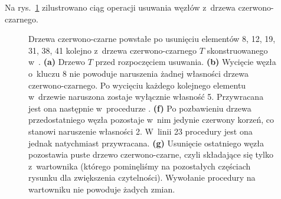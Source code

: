 
\exercise %
\exercise %
\exercise %
Na rys.\ \ref{fig:13.4-3} zilustrowano ciąg operacji usuwania węzłów z~drzewa czerwono-czarnego.
\begin{figure}[!ht]
	\centering 
	\caption{Drzewa czerwono-czarne powstałe po usunięciu elementów 8, 12, 19, 31, 38, 41 kolejno z~drzewa czerwono-czarnego $T$ skonstruowanego w~.
	{\sffamily\bfseries(a)} Drzewo $T$ przed rozpoczęciem usuwania.
	{\sffamily\bfseries(b)} Wycięcie węzła o~kluczu 8 nie powoduje naruszenia żadnej własności drzewa czerwono-czarnego.
	{\sffamily\bfseries{}} Po wycięciu każdego kolejnego elementu w~drzewie naruszona zostaje wyłącznie własność 5.
	Przywracana jest ona następnie w~procedurze .
	{\sffamily\bfseries{(f)}} Po pozbawieniu drzewa przedostatniego węzła pozostaje w~nim jedynie czerwony korzeń, co stanowi naruszenie własności 2.
        W~linii 23 procedury  jest ona jednak natychmiast przywracana.
        {\sffamily\bfseries{(g)}} Usunięcie ostatniego węzła pozostawia puste drzewo czerwono-czarne, czyli składające się tylko z~wartownika  (którego pominęliśmy na pozostałych częściach rysunku dla zwiększenia czytelności).
        Wywołanie procedury  na wartowniku nie powoduje żadych zmian.} \label{fig:13.4-3}
\end{figure}

\exercise %
\exercise %
\exercise %
\exercise %
